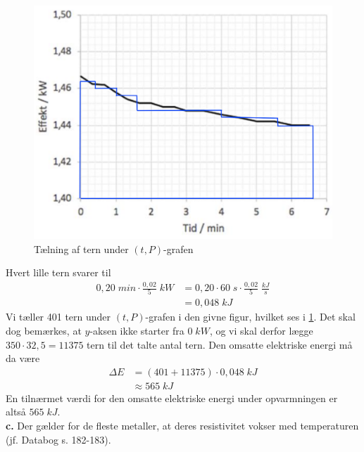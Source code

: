 \documentclass{report}
\begin{document}
\begin{figure}[H]
\begin{center}
  \includegraphics[width=\textwidth]{tern.png}
\end{center}
\caption{Tælning af tern under $(t,P)$-grafen}
\label{fig:tern}
\end{figure}
Hvert lille tern svarer til 
\begin{equation*}
\begin{split}
0,20 \;\unit{min} \cdot \frac{0,02}{5} \;\unit{kW} &=0,20 \cdot 60 \;\unit{s} \cdot \frac{0,02}{5}\;\unit{\frac{kJ}{s}} \\
&=0,048 \;\unit{kJ} 
\end{split}
\end{equation*}
Vi tæller 401 tern under $(t,P)$-grafen i den givne figur, hvilket ses i \cref{fig:tern}.
Det skal dog bemærkes, at $y$-aksen ikke starter fra $0 \;\unit{kW} $, og vi skal derfor lægge $350 \cdot 32,5 =11375$ tern til det talte antal tern. 
Den omsatte elektriske energi må da være
\begin{equation*}
\begin{split}
\Delta E &=(401 + 11375) \cdot 0,048 \;\unit{kJ} \\
&\approx 565 \;\unit{kJ} 
\end{split}
\end{equation*}
En tilnærmet værdi for den omsatte elektriske energi under opvarmningen er altså $565 \;\unit{kJ} $.\\[1ex]
\textbf{c.}
Der gælder for de fleste metaller, at deres resistivitet vokser med temperaturen (jf. Databog s. 182-183).
\end{document}
